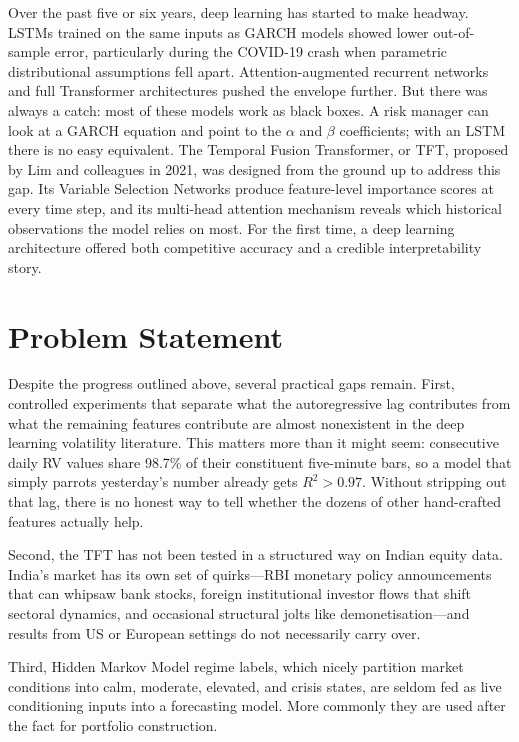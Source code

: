 Over the past five or six years, deep learning has started to make headway. LSTMs trained on the same inputs as GARCH models showed lower out-of-sample error, particularly during the COVID-19 crash when parametric distributional assumptions fell apart. Attention-augmented recurrent networks and full Transformer architectures pushed the envelope further. But there was always a catch: most of these models work as black boxes. A risk manager can look at a GARCH equation and point to the $\alpha$ and $\beta$ coefficients; with an LSTM there is no easy equivalent. The Temporal Fusion Transformer, or TFT, proposed by Lim and colleagues in 2021, was designed from the ground up to address this gap. Its Variable Selection Networks produce feature-level importance scores at every time step, and its multi-head attention mechanism reveals which historical observations the model relies on most. For the first time, a deep learning architecture offered both competitive accuracy and a credible interpretability story.

\section{Problem Statement}

Despite the progress outlined above, several practical gaps remain. First, controlled experiments that separate what the autoregressive lag contributes from what the remaining features contribute are almost nonexistent in the deep learning volatility literature. This matters more than it might seem: consecutive daily RV values share 98.7\% of their constituent five-minute bars, so a model that simply parrots yesterday's number already gets $R^2 > 0.97$. Without stripping out that lag, there is no honest way to tell whether the dozens of other hand-crafted features actually help.

Second, the TFT has not been tested in a structured way on Indian equity data. India's market has its own set of quirks---RBI monetary policy announcements that can whipsaw bank stocks, foreign institutional investor flows that shift sectoral dynamics, and occasional structural jolts like demonetisation---and results from US or European settings do not necessarily carry over.

Third, Hidden Markov Model regime labels, which nicely partition market conditions into calm, moderate, elevated, and crisis states, are seldom fed as live conditioning inputs into a forecasting model. More commonly they are used after the fact for portfolio construction.

